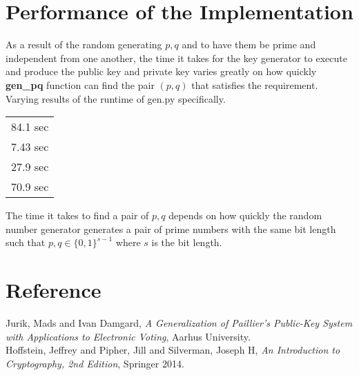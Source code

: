 \documentclass[12pt]{amsart}
\begin{document}
\section*{\textbf{Performance of the Implementation}}
As a result of the random generating $p,q$ and to have them be prime and independent
from one another, the time it takes for the key generator to execute and produce
the public key and private key varies greatly on how quickly \textbf{gen\_pq} function
can find the pair $(p,q)$ that satisfies the requirement.\\


Varying results of the runtime of gen.py specifically.\\
\begin{center}
\begin{tabular}{|c|}
 \hline
 84.1 sec \\
 7.43 sec \\
 27.9 sec\\
 70.9 sec \\
 \hline
\end{tabular}
\end{center}

The time it takes to find a pair of $p,q$ depends on how quickly the random
number generator generates a pair of prime numbers with the same bit length
such that $p,q \in \{0,1\}^{s-1}$ where $s$ is the bit length.

\newpage
\section*{\textbf{Reference}}
Jurik, Mads and Ivan Damgard, \textit{A Generalization of Paillier’s Public-Key System
with Applications to Electronic Voting}, Aarhus University. \\

Hoffstein, Jeffrey and Pipher, Jill and Silverman, Joseph H, \textit{An Introduction to
Cryptography, 2nd Edition}, Springer 2014. \\
\end{document}
